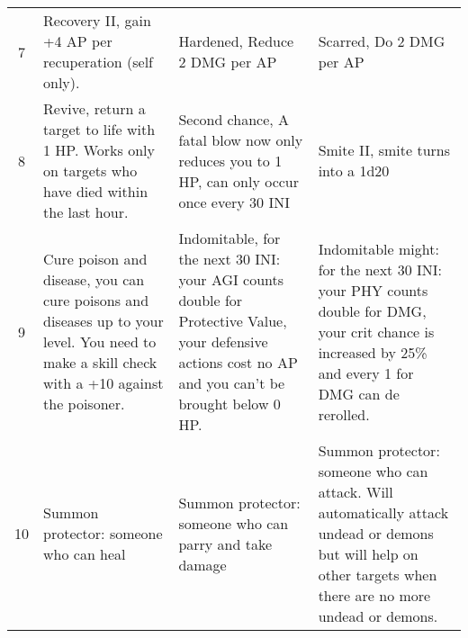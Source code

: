\begin{longtable}{ c p{4cm} p{4cm} p{4cm} }
7 &
Recovery II, gain +4 AP per recuperation (self only). &
Hardened, Reduce 2 DMG per AP &
Scarred, Do 2 DMG per AP \\

8 &
Revive, return a target to life with 1 HP. Works only on targets who have died within the last hour. &
Second chance, A fatal blow now only reduces you to 1 HP, can only occur once every 30 INI &
Smite II, smite turns into a 1d20 \\

9 &
Cure poison and disease, you can cure poisons and diseases up to your level. You need to make a skill check with a +10 against the poisoner. &
Indomitable, for the next 30 INI: your AGI counts double for Protective Value, your defensive actions cost no AP and you can't be brought below 0 HP. &
Indomitable might: for the next 30 INI: your PHY counts double for DMG, your crit chance is increased by 25\% and every 1 for DMG can de rerolled. \\
 
10 &
Summon protector: someone who can heal &
Summon protector: someone who can parry and take damage &
Summon protector: someone who can attack. Will automatically attack undead or demons but will help on other targets when there are no more undead or demons. \\


\end{longtable}

